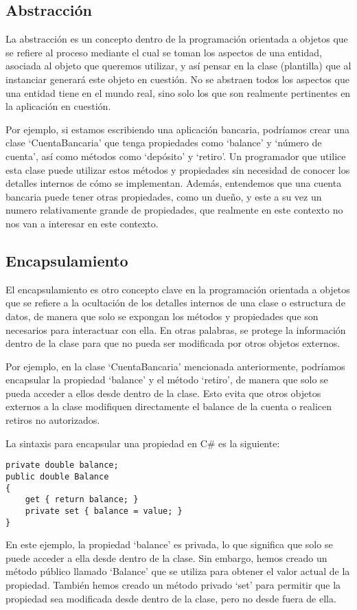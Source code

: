 \documentclass[executivepaper]{article}
\begin{document}
\subsection{Abstracción}

La abstracción es un concepto dentro de la programación orientada a objetos que se refiere al proceso mediante el cual se toman los aspectos de una entidad, asociada al objeto que queremos utilizar, y así pensar en la clase (plantilla) que al instanciar generará este objeto en cuestión. No se abstraen todos los aspectos que una entidad tiene en el mundo real, sino solo los que son realmente pertinentes en la aplicación en cuestión. 

Por ejemplo, si estamos escribiendo una aplicación bancaria, podríamos crear una clase \enquote*{CuentaBancaria} que tenga propiedades como \enquote*{balance} y \enquote*{número de cuenta}, así como métodos como \enquote*{depósito} y \enquote*{retiro}. Un programador que utilice esta clase puede utilizar estos métodos y propiedades sin necesidad de conocer los detalles internos de cómo se implementan. Además, entendemos que una cuenta bancaria puede tener otras propiedades, como un dueño, y este a su vez un numero relativamente grande de propiedades, que realmente en este contexto no nos van a interesar en este contexto.

\subsection{Encapsulamiento}

El encapsulamiento es otro concepto clave en la programación orientada a objetos que se refiere a la ocultación de los detalles internos de una clase o estructura de datos, de manera que solo se expongan los métodos y propiedades que son necesarios para interactuar con ella. En otras palabras, se protege la información dentro de la clase para que no pueda ser modificada por otros objetos externos.

Por ejemplo, en la clase \enquote*{CuentaBancaria} mencionada anteriormente, podríamos encapsular la propiedad \enquote*{balance} y el método \enquote*{retiro}, de manera que solo se pueda acceder a ellos desde dentro de la clase. Esto evita que otros objetos externos a la clase modifiquen directamente el balance de la cuenta o realicen retiros no autorizados.

La sintaxis para encapsular una propiedad en C\# es la siguiente:
\begin{lstlisting}
private double balance;
public double Balance
{
    get { return balance; }
    private set { balance = value; }
}
\end{lstlisting}
En este ejemplo, la propiedad \enquote*{balance} es privada, lo que significa que solo se puede acceder a ella desde dentro de la clase. Sin embargo, hemos creado un método público llamado \enquote*{Balance} que se utiliza para obtener el valor actual de la propiedad. También hemos creado un método privado \enquote*{set} para permitir que la propiedad sea modificada desde dentro de la clase, pero no desde fuera de ella.
\end{document}
